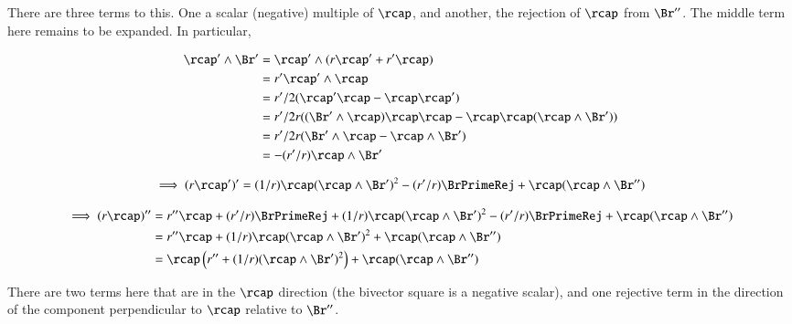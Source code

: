 There are three terms to this.  One a scalar (negative) multiple of $\rcap$, and another, the rejection of $\rcap$ from $\Br''$.  The middle term here remains to be expanded.  In particular,

\begin{align*}
\rcap' \wedge \Br' 
   &= \rcap' \wedge (r\rcap' + r'\rcap) \\
   &= r' \rcap' \wedge \rcap \\
   &= r'/2 (\rcap'\rcap - \rcap\rcap') \\
   &= r'/2r ((\Br' \wedge \rcap)\rcap\rcap - \rcap\rcap(\rcap \wedge \Br')) \\
   &= r'/2r (\Br' \wedge \rcap - \rcap \wedge \Br') \\
   &= -(r'/r) \rcap \wedge \Br' \\
\end{align*}

\begin{align*}
\implies
(r\rcap')' 
   &= 
(1/r)\rcap(\rcap \wedge \Br')^2 
-(r'/r)\BrPrimeRej 
+\rcap(\rcap \wedge \Br'') \\
\end{align*}

\begin{align*}
\implies
(r\rcap)'' 
   &= r''\rcap 
+(r'/r)\BrPrimeRej
+(1/r)\rcap(\rcap \wedge \Br')^2 
-(r'/r)\BrPrimeRej
+\rcap(\rcap \wedge \Br'') \\
   &= r''\rcap 
    +(1/r)\rcap(\rcap \wedge \Br')^2 
    +\rcap(\rcap \wedge \Br'') \\
   &= 
\rcap \left(  r'' +(1/r)(\rcap \wedge \Br')^2\right) +    \rcap(\rcap \wedge \Br'') \\
\end{align*}

There are two terms here that are in the $\rcap$ direction (the bivector square is a negative scalar), and
one rejective term in the direction of the component perpendicular to $\rcap$ relative to $\Br''$.

